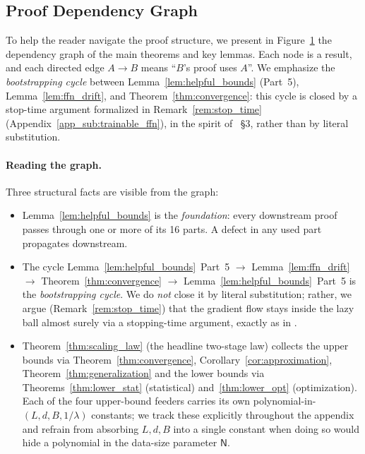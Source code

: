 \documentclass[11pt]{article}
\let\citet\citep
\theoremstyle{plain}
\begin{document}
\subsection{Proof Dependency Graph}\label{app_sub:dependency_graph}

To help the reader navigate the proof structure, we present in Figure~\ref{fig:proof_dependency} the dependency graph of the main theorems and key lemmas. Each node is a result, and each directed edge $A\to B$ means ``$B$'s proof uses $A$''. We emphasize the {\it bootstrapping cycle} between Lemma~\ref{lem:helpful_bounds} (Part~5), Lemma~\ref{lem:ffn_drift}, and Theorem~\ref{thm:convergence}: this cycle is closed by a stop-time argument formalized in Remark~\ref{rem:stop_time} (Appendix~\ref{app_sub:trainable_ffn}), in the spirit of \citet{dzps19}~\S 3, rather than by literal substitution.

\begin{figure}[omitted: a diagram of this paper's results, not reproduced here]\label{fig:proof_dependency}\end{figure}

\paragraph{Reading the graph.} Three structural facts are visible from the graph:
\begin{itemize}
    \item[(a)] Lemma~\ref{lem:helpful_bounds} is the {\it foundation}: every downstream proof passes through one or more of its 16 parts. A defect in any used part propagates downstream.
    \item[(b)] The cycle Lemma~\ref{lem:helpful_bounds}~Part~5 $\to$ Lemma~\ref{lem:ffn_drift} $\to$ Theorem~\ref{thm:convergence} $\to$ Lemma~\ref{lem:helpful_bounds}~Part~5 is the {\it bootstrapping cycle}. We do {\it not} close it by literal substitution; rather, we argue (Remark~\ref{rem:stop_time}) that the gradient flow stays inside the lazy ball almost surely via a stopping-time argument, exactly as in \citet[Section~3]{dzps19}.
    \item[(c)] Theorem~\ref{thm:scaling_law} (the headline two-stage law) collects the upper bounds via Theorem~\ref{thm:convergence}, Corollary~\ref{cor:approximation}, Theorem~\ref{thm:generalization} and the lower bounds via Theorems~\ref{thm:lower_stat} (statistical) and~\ref{thm:lower_opt} (optimization). Each of the four upper-bound feeders carries its own polynomial-in-$(L,d,B,1/\lambda)$ constants; we track these explicitly throughout the appendix and refrain from absorbing $L,d,B$ into a single constant when doing so would hide a polynomial in the data-size parameter $\mathsf{N}$.
\end{itemize}
\end{document}

